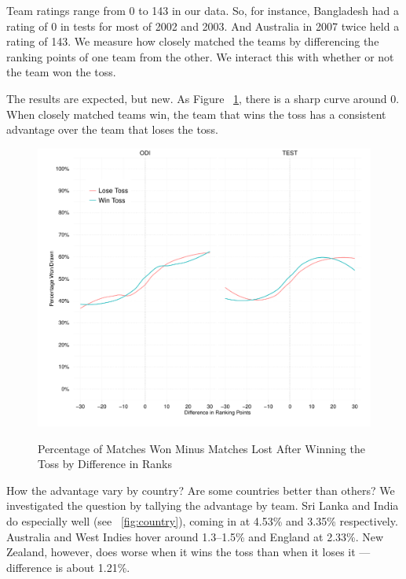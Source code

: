 \documentclass[12pt]{article}
\begin{document}
Team ratings range from 0 to 143 in our data. So, for instance, Bangladesh had a rating of 0 in tests for most of 2002 and 2003. And Australia in 2007 twice held a rating of 143. We measure how closely matched the teams by differencing the ranking points of one team from the other. We interact this with whether or not the team won the toss. 

The results are expected, but new. As Figure ~\ref{fig:ranks}, there is a sharp curve around 0. When closely matched teams win, the team that wins the toss has a consistent advantage over the team that loses the toss.

\begin{figure}[htbp]
\centering
\caption{Percentage of Matches Won Minus Matches Lost After Winning the Toss by Difference in Ranks}
\includegraphics[width=1\textwidth]{../figs/winbyRank.pdf}
\label{fig:ranks}
\end{figure}

How the advantage vary by country? Are some countries better than others? We investigated the question by tallying the advantage by team. Sri Lanka and India do especially well (see ~\ref{fig:country}), coming in at 4.53\% and 3.35\% respectively. Australia and West Indies hover around 1.3--1.5\% and England at 2.33\%. New Zealand, however, does worse when it wins the toss than when it loses it --- difference is about 1.21\%.
\end{document}
